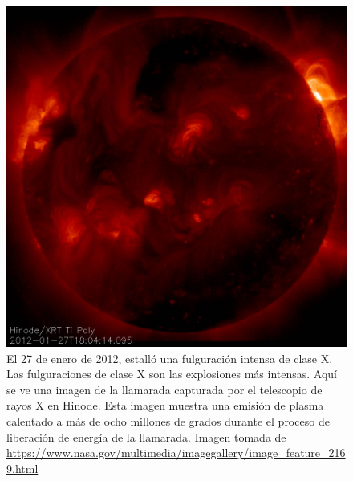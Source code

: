 \begin{figure}[H]
  \centering
    \includegraphics[scale=0.3]{Apendice1/figs/claseX.jpg}      %
  \caption[Fulguración solar de clase X, 27 de enero de 2012]{El 27 de enero de 2012, estalló una fulguración intensa de clase X. Las fulguraciones de clase X son las explosiones más intensas. Aquí se ve una imagen de la llamarada capturada por el telescopio de rayos X en Hinode. Esta imagen muestra una emisión de plasma calentado a más de ocho millones de grados durante el proceso de liberación de energía de la llamarada. Imagen tomada de \url{https://www.nasa.gov/multimedia/imagegallery/image_feature_2169.html}}            %
  \label{classX}                            %
\end{figure}


